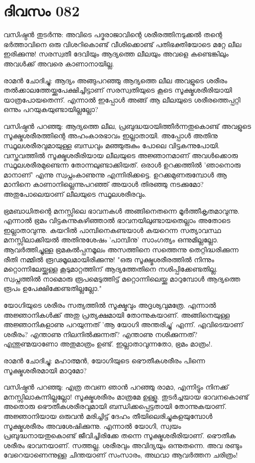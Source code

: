 \newpage
\section{ദിവസം 082}


വസിഷ്ഠന്‍ തുടര്‍ന്നു: അവിടെ പദ്മരാജാവിന്റെ ശരീരത്തിനടുക്കല്‍ തന്റെ ഭര്‍ത്താവിനെ ഒരു വിശറികൊണ്ട്‌ വീശിക്കൊണ്ട്‌ പതിഭക്തിയോടെ മറ്റേ ലീല ഇരിക്കുന്നു! സരസ്വതീ ദേവിയും ആദ്യത്തെ ലീലയും അവളെ കണ്ടെങ്കിലും അവള്‍ക്ക്‌ അവരെ കാണാനായില്ല.

രാമന്‍ ചോദിച്ചു: ആദ്യം അങ്ങുപറഞ്ഞു ആദ്യത്തെ ലീല അവളുടെ ശരീരം തല്‍ക്കാലത്തേയ്ക്കുപേക്ഷിച്ചിട്ടാണ്‌ സരസ്വതിയുടെ കൂടെ സൂക്ഷ്മശരീരിയായി യാത്രപോയതെന്ന്. എന്നാല്‍ ഇപ്പോള്‍ അങ്ങ്‌ ആ ലീലയുടെ ശരീരത്തെപ്പറ്റി ഒന്നും പറയുകയുണ്ടായില്ലല്ലോ?

വസിഷ്ഠന്‍ പറഞ്ഞു: ആദ്യത്തെ ലീല, പ്രബുദ്ധയായിത്തീര്‍ന്നതുകൊണ്ട്‌ അവളുടെ സൂക്ഷ്മശരീരത്തിന്റെ അഹംകാരഭാവം ഇല്ലാതായി. അപ്പോള്‍ അതിനു സ്ഥൂലശരീരവുമായുള്ള ബന്ധവും മഞ്ഞുരുകും പോലെ വിട്ടകന്നുപോയി. വസ്തവത്തില്‍ സൂക്ഷ്മശരീരിയായ ലീലയുടെ അജ്ഞാനമാണ്‌ അവള്‍ക്കൊരു സ്ഥൂലശരീരമുണ്ടെന്ന തോന്നലുണ്ടാക്കിയത്‌. ഒരാള്‍ ഉറക്കത്തില്‍ 'ഞാനൊരു മാനാണ്‌' എന്നു സ്വപ്നംകാണുന്നു എന്നിരിക്കട്ടെ. ഉറക്കമുണരുമ്പോള്‍ ആ മാനിനെ കാണാനില്ലെന്നുപറഞ്ഞ്‌ അയാള്‍ തിരഞ്ഞു നടക്കുമോ? അതുപോലെയാണ്‌ ലീലയുടെ സ്ഥൂലശരീരവും.

ഭ്രമബാധിതന്റെ മനസ്സിലെ ഭാവനകള്‍ അങ്ങിനെതന്നെ മൂര്‍ത്തീകൃതമാവുന്നു. എന്നാല്‍ ഭ്രമം വിട്ടകന്നുകഴിഞ്ഞാല്‍ ഭാവനയിലുണ്ടായതെല്ലാം അതോടെ ഇല്ലാതാവുന്നു. കയറില്‍ പാമ്പിനെകണ്ടയാള്‍ കയറെന്ന സത്യാവസ്ഥ മനസ്സിലാക്കിയല്‍ അതിനുശേഷം 'പാമ്പിനു' സാംഗത്യം ഒന്നുമില്ലല്ലോ. ആവര്‍ത്തിച്ചുള്ള ഭ്രമകല്‍പ്പനമൂലം അസത്തിനെ സത്തെന്നു തെറ്റിദ്ധരിക്കുന്ന രീതി നമ്മില്‍ രൂഢമൂലമായിരിക്കുന്നു! "ഒരു സൂക്ഷ്മശരീരത്തില്‍ നിന്നും മറ്റൊന്നിലേയ്ക്കുള്ള കൂടുമാറ്റത്തിന്‌ ആദ്യത്തേതിനെ നശിപ്പിക്കേണ്ടതില്ല. സ്വപ്നത്തില്‍ നാമൊരു രൂപമെടുത്തിട്ട്‌ മറ്റൊന്നിലെയ്ക്കു മാറുമ്പോള്‍ ആദ്യത്തെ രൂപം ഉപേക്ഷിക്കേണ്ടതില്ലല്ലോ." 

യോഗിയുടെ ശരീരം സത്യത്തില്‍  സൂക്ഷ്മവും അദൃശ്യവുമത്രേ. എന്നാല്‍ അജ്ഞാനികള്‍ക്ക്‌ അതു പ്രത്യക്ഷമായി തോന്നുകയാണ്‌. അങ്ങിനെയുള്ള അജ്ഞാനികളാണു പറയുന്നത്‌ 'ആ യോഗി അന്തരിച്ചു' എന്ന്. എവിടെയാണ്‌ ശരീരം? എന്താണു നിലനില്‍ക്കുന്നത്‌? എന്താണു നശിക്കുന്നത്‌? എന്തുണ്മയാണോ അതുമാത്രം ഉണ്ട്‌. ഇല്ലാതാവുന്നതോ, ഭ്രമം മാത്രം!.

രാമന്‍ ചോദിച്ചു: മഹാത്മന്‍, യോഗിയുടെ ഭൌതീകശരീരം പിന്നെ സൂക്ഷ്മശരീരമായി മാറുമോ? 

വസിഷ്ഠന്‍ പറഞ്ഞു: എത്ര തവണ ഞാന്‍ പറഞ്ഞു രാമാ, എന്നിട്ടും നിനക്ക്‌ മനസ്സിലാകുന്നില്ലല്ലോ! സൂക്ഷ്മശരീരം മാത്രമേ ഉള്ളൂ. തുടര്‍ച്ചയായ ഭാവനകൊണ്ട്‌ അതൊരു ഭൌതീകശരീരവുമായി ബന്ധിക്കപ്പെട്ടതായി തോന്നുകയാണ്‌. അജ്ഞാനിയായ ഒരുവന്‍ മരിച്ചിട്ട്‌ ദേഹം തീയിലെരിച്ചുകളയുമ്പോള്‍ സൂക്ഷ്മശരീരം അവശേഷിക്കുന്നു. എന്നാല്‍ യോഗി, സ്വയം പ്രബുദ്ധനായതുകൊണ്ട്‌ ജീവിച്ചിരിക്കേ തന്നെ സൂക്ഷ്മശരീരിയാണ്‌. ഭൌതീക ശരീരം ഭാവനയാണ്‌. സത്തല്ല. ശരീരവും അവിദ്യയും ഒന്നുതന്നെ. അവ രണ്ടും വേറെയാണെന്നുള്ള ചിന്തയാണ്‌ സംസാരം, അഥവാ ആവര്‍ത്തന ചരിത്രം! 

